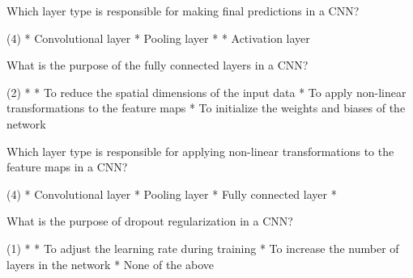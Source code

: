 \documentclass[10pt]{extarticle}
\begin{document}
\begin{exercise}
    Which layer type is responsible for making final predictions in a CNN?
    \begin{choice} (4)
        * Convolutional layer
        * Pooling layer
        * 
        * Activation layer
    \end{choice}
\end{exercise}
\begin{solution}
\end{solution}

\begin{exercise}
    What is the purpose of the fully connected layers in a CNN?
    \begin{choice} (2)
        * 
        * To reduce the spatial dimensions of the input data
        * To apply non-linear transformations to the feature maps
        * To initialize the weights and biases of the network
    \end{choice}
\end{exercise}
\begin{solution}
\end{solution}


\begin{exercise}
    Which layer type is responsible for applying non-linear transformations to the feature maps in a CNN?
    \begin{choice} (4)
        * Convolutional layer
        * Pooling layer
        * Fully connected layer
        * 
    \end{choice}
\end{exercise}
\begin{solution}
\end{solution}

\begin{exercise}
    What is the purpose of dropout regularization in a CNN?
    \begin{choice} (1)
        * 
        * To adjust the learning rate during training
        * To increase the number of layers in the network
        * None of the above
    \end{choice}
\end{exercise}
\begin{solution}
\end{solution}
\end{document}
